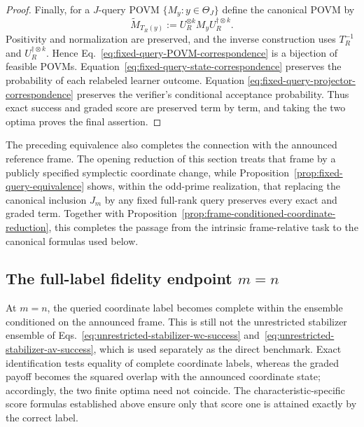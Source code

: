 \documentclass[11pt]{article}
\newcommand{\1}{\mathbf 1}
\theoremstyle{plain}
\theoremstyle{definition}
\theoremstyle{remark}
\begin{document}
\begin{proof}
Finally, for a $J$-query POVM $\{M_y:y\in\Theta_J\}$ define the canonical POVM
by
\begin{equation}
 \widetilde M_{T_R(y)}
 :=U_R^{\otimes k}M_yU_R^{\dagger\otimes k}.
 \label{eq:fixed-query-POVM-correspondence}
\end{equation}
Positivity and normalization are preserved, and the inverse construction uses
$T_R^{-1}$ and $U_R^{\dagger\otimes k}$.  Hence
Eq.~\eqref{eq:fixed-query-POVM-correspondence} is a bijection of feasible POVMs.
Equation~\eqref{eq:fixed-query-state-correspondence} preserves the
probability of each relabeled learner outcome.  Equation
\eqref{eq:fixed-query-projector-correspondence} preserves the verifier's
conditional acceptance probability.  Thus exact success and graded score are
preserved term by term, and taking the two optima proves the final assertion.
\end{proof}

The preceding equivalence also completes the connection with the announced
reference frame.  The opening reduction of this section treats that frame by a
publicly specified symplectic coordinate change, while
Proposition~\ref{prop:fixed-query-equivalence} shows, within the odd-prime
realization, that replacing the canonical inclusion $J_m$ by any fixed
full-rank query preserves every exact and graded term.  Together with
Proposition~\ref{prop:frame-conditioned-coordinate-reduction}, this completes
the passage from the intrinsic frame-relative task to the canonical formulas
used below.
\subsection{The full-label fidelity endpoint \texorpdfstring{$m=n$}{m=n}}
\label{subsec:complete-endpoint}
At $m=n$, the queried coordinate label becomes complete within the ensemble
conditioned on the announced frame.  This is still not the unrestricted
stabilizer ensemble of Eqs.~\eqref{eq:unrestricted-stabilizer-wc-success} and~\eqref{eq:unrestricted-stabilizer-av-success}, which is
used separately as the direct benchmark.  Exact identification tests equality
of complete coordinate labels, whereas the graded payoff becomes the squared
overlap with the announced coordinate state; accordingly, the two finite
optima need not coincide.  The characteristic-specific score formulas established above ensure only
that score one is attained exactly by the correct label.
\end{document}
